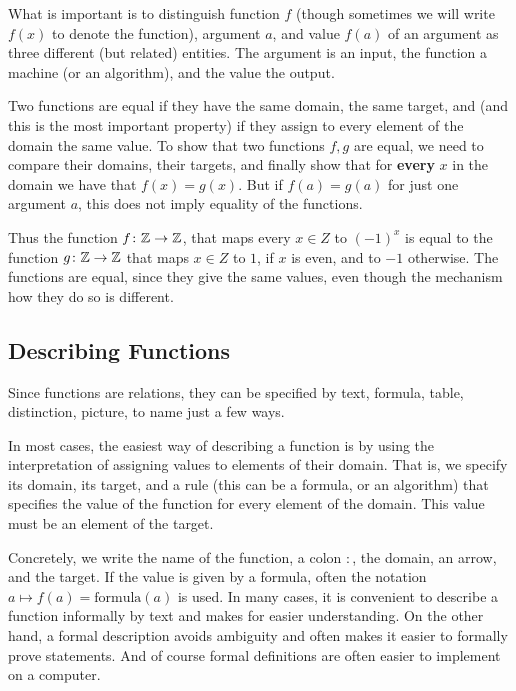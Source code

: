What is important is to distinguish function $f$ (though sometimes we will write $f(x)$
to denote the function), argument $a$, and value
$f(a)$ of an
argument as three different (but related) entities. The argument is an
input, the function a machine (or an algorithm), and the value the output.
\smallskip

Two functions are equal if they have the same domain, the same target, and
(and this is the most important property)
if they assign to every element of the domain the same value.
To show that two functions $f,g$ are equal, we need to compare their
domains, their targets, and finally show that for \textbf{every} $x$ in the
domain we have that $f(x)=g(x)$.
But if $f(a)=g(a)$ for just one argument $a$, this does not imply equality
of the functions.

Thus the function $f\colon{\mathbb Z}\to{\mathbb Z}$, that maps every $x\in Z$ to $(-1)^x$ is
equal to the function $g\colon{\mathbb Z}\to{\mathbb Z}$ that maps $x\in Z$ to $1$, if $x$ is
even, and to $-1$ otherwise. The functions are equal, since they give the
same values, even though the mechanism how they do so is different.

\subsection{Describing Functions}
Since functions are relations, they can be specified by
text, formula, table, distinction, picture,
to name just a few ways. 

In most cases, the easiest way of describing a function is by
using the interpretation of assigning values to elements of
their domain. That is, we specify
its domain, its target, and a rule (this can be a formula, or an algorithm)
that specifies the value of the
function for every element of the domain. This value must be an element of
the target.

Concretely, we write the name of the
function, a colon $\colon$, the domain, an arrow, and the target. If the
value is given by a formula, often the notation $a\mapsto f(a)=\mbox{formula}(a)$
is used. In many cases, it is convenient to describe a function informally
by text and makes for easier understanding. On the other hand, a formal
description avoids ambiguity and often makes it easier to formally prove
statements. And of course formal definitions are often easier to implement on a
computer.

